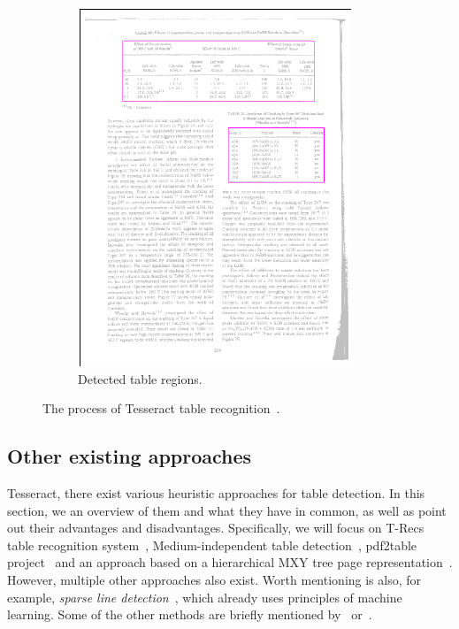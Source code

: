 \begin{figure}
\begin{subfigure}{0.30\textwidth}
\includegraphics[width=\linewidth]{img/tableDetection/tableDetectionResult.pdf}
\caption{Detected table regions.}
\label{fig:tessTableDet5}
\end{subfigure}
\caption{The process of Tesseract table recognition~\cite{tableDetHeterogeneous}.}
\label{fig:tesseractTableRecognition}
\end{figure}

\subsection{Other existing approaches}

 Tesseract, there exist various heuristic approaches  for table detection. In this section, we  an overview of  them and  what they have in common, as well as point out their advantages and disadvantages. Specifically, we will focus on T-Recs table recognition system~\citep{TRecs}, Medium-independent table detection~\citep{MediumTable}, pdf2table project~\cite{pdf2table} and an approach based on a hierarchical MXY tree page representation~\citep{tableDetectCesarini}. However, multiple other approaches also exist. Worth mentioning is also, for example, \emph{sparse line detection}~\cite{sparseLineDetection}, which already uses principles of machine learning. Some of the other methods are briefly mentioned by~\citet{otherDetection1} or~\citet{otherDetection2}.

